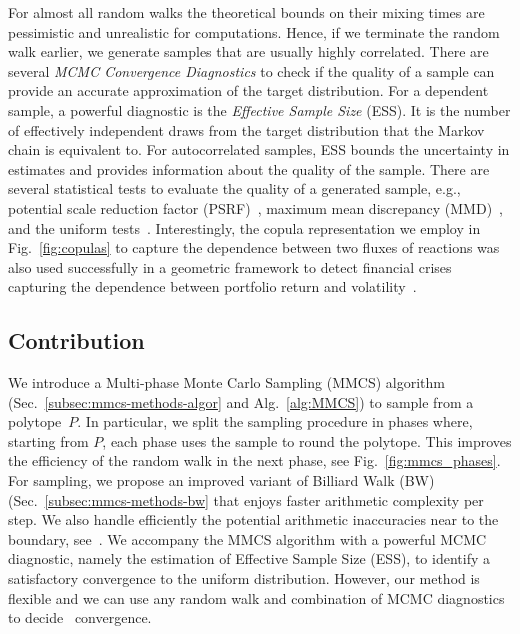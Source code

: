    For almost all random walks the theoretical bounds on their mixing times are
   pessimistic and unrealistic for  computations. Hence,
   if we terminate the random walk earlier, we generate samples that are  usually highly correlated.
   There are several \textit{MCMC Convergence Diagnostics} \cite{Roy20} to check
   if  the quality of a  sample can  provide an accurate
   approximation of the target distribution. For a dependent sample, a powerful
   diagnostic is the \textit {Effective Sample Size} (ESS). It is the number of
   effectively independent draws from the target distribution that the Markov chain
   is equivalent to. For autocorrelated samples, ESS bounds
   the uncertainty in estimates \cite{geyer92} and provides  information about
   the quality of the sample. There are several statistical tests to evaluate the quality of a generated sample, e.g., potential scale reduction factor (PSRF)~\cite{Gelman92}, maximum mean discrepancy (MMD)~\cite{Gretton12},
   and the uniform tests~\cite{CousinsThesis17}.
   Interestingly, 
   the copula representation we employ in Fig.~\ref{fig:copulas} to capture the dependence between two fluxes of reactions was also used  successfully in a geometric framework to detect financial crises capturing the dependence between portfolio return and volatility~\cite{Cales18}.

\subsection{Contribution}
\label{sec:mmcs-contribution}


   We introduce a Multi-phase Monte Carlo Sampling (MMCS) algorithm
   (Sec.~\ref{subsec:mmcs-methods-algor} and Alg.~\ref{alg:MMCS}) to sample from a polytope~$P$. In
   particular, we split the sampling procedure in phases where, starting from $P$,
   each phase uses the sample to round the polytope. This improves the efficiency
   of the random walk in the next phase, see Fig.~\ref{fig:mmcs_phases}.
   For sampling, we propose an improved variant of Billiard Walk (BW)
   (Sec.~\ref{subsec:mmcs-methods-bw} that enjoys faster
   arithmetic complexity per step. We also handle efficiently the potential arithmetic inaccuracies near to the boundary, see~\cite{ChePioCaz18}.
   We accompany the MMCS algorithm with a powerful MCMC diagnostic, namely the
   estimation of Effective Sample Size (ESS), to identify a satisfactory
   convergence to the uniform distribution.
   However, our method is flexible and  we can
   use any  random walk and
   combination of MCMC diagnostics to decide~
   convergence.


